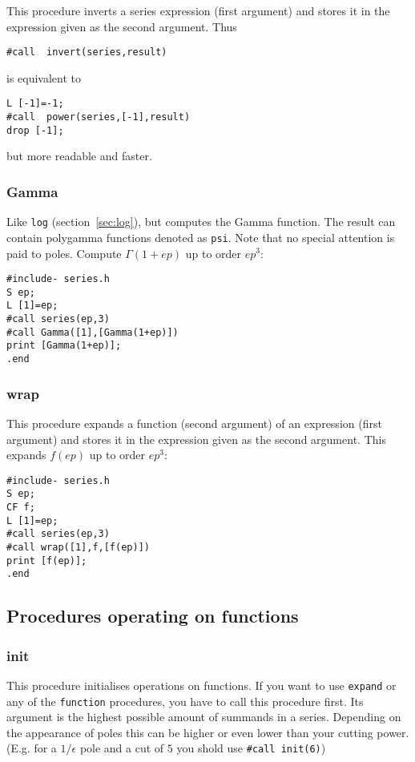 \documentclass[titlepage]{article}
\begin{document}
This procedure inverts a series expression (first argument) and stores
it in the expression given as the second argument. Thus
\begin{verbatim}
#call  invert(series,result)
\end{verbatim}
is equivalent to
\begin{verbatim}
L [-1]=-1;
#call  power(series,[-1],result)
drop [-1];
\end{verbatim}
but more readable and faster.

\subsubsection{Gamma}
\label{sec:gamma}

Like {\tt log} (section~\ref{sec:log}), but computes the
Gamma function. The result can contain polygamma functions denoted as
{\tt psi}. Note that no special attention is paid to poles.
Compute $\Gamma(1+ep)$ up to order $ep^3$:
\begin{verbatim}
#include- series.h
S ep;
L [1]=ep;
#call series(ep,3)
#call Gamma([1],[Gamma(1+ep)])
print [Gamma(1+ep)];
.end
\end{verbatim}


\subsubsection{wrap}
\label{sec:wrap}

This procedure expands a function (second argument) of an expression
(first argument)
and stores it in the expression given as the second argument.
This expands $f(ep)$ up to order $ep^3$:
\begin{verbatim}
#include- series.h
S ep;
CF f;
L [1]=ep;
#call series(ep,3)
#call wrap([1],f,[f(ep)])
print [f(ep)];
.end
\end{verbatim}

\subsection{Procedures operating on functions}
\label{sec:proc_fun}

\subsubsection{init}
\label{sec:invert}

This procedure initialises operations on functions. If you want to use
{\tt expand} or any of the {\tt *function} procedures, you have to call
this procedure first. Its argument is the highest possible amount of
summands in a series. Depending on the appearance of poles this can be
higher or even lower than your cutting power. (E.g. for a $1/\epsilon$
pole and a cut of $5$ you shold use {\tt \#call init(6)})
\end{document}

